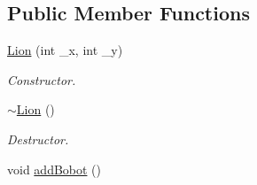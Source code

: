 \subsection*{Public Member Functions}
\begin{DoxyCompactItemize}
\item 
\hyperlink{classLion_aff2734ad945e35069dab03493aa34e51}{Lion} (int \-\_\-x, int \-\_\-y)
\begin{DoxyCompactList}\small\item\em Constructor. \end{DoxyCompactList}\item 
\hypertarget{classLion_add3b70c968c9382d00f25f5d148e590f}{\hyperlink{classLion_add3b70c968c9382d00f25f5d148e590f}{$\sim$\-Lion} ()}\label{classLion_add3b70c968c9382d00f25f5d148e590f}

\begin{DoxyCompactList}\small\item\em Destructor. \end{DoxyCompactList}\item 
\hypertarget{classLion_aff4d22a6a78a3d029c612c92bd878e7a}{void \hyperlink{classLion_aff4d22a6a78a3d029c612c92bd878e7a}{add\-Bobot} ()}\label{classLion_aff4d22a6a78a3d029c612c92bd878e7a}


\end{DoxyCompactItemize}
